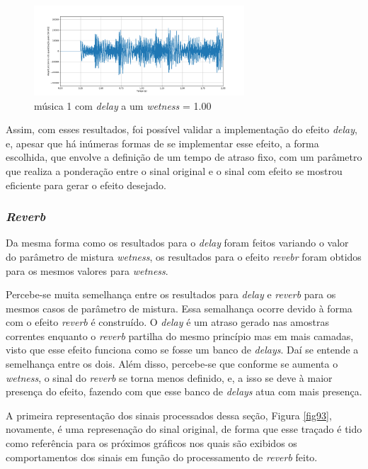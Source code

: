 \begin{figure}[h]
    \centering
    \includegraphics[width=0.7\textwidth]{figuras/fig92.png}
    \caption{música 1 com \textit{delay} a um \textit{wetness} = 1.00}
    \label{fig92}
\end{figure}

Assim, com esses resultados, foi possível validar a implementação do efeito \textit{delay}, e, apesar que há inúmeras formas de se implementar esse efeito, a forma escolhida, que envolve a definição de um tempo de atraso fixo, com um parâmetro que realiza a ponderação entre o sinal original e o sinal com efeito se mostrou eficiente para gerar o efeito desejado.

\subsubsection*{\textit{Reverb}}

Da mesma forma como os resultados para o \textit{delay} foram feitos variando o valor do parâmetro de mistura \textit{wetness}, os resultados para o efeito \textit{revebr} foram obtidos para os mesmos valores para \textit{wetness}.

Percebe-se muita semelhança entre os resultados para \textit{delay} e \textit{reverb} para os mesmos casos de parâmetro de mistura. Essa semalhança ocorre devido à forma com o efeito \textit{reverb} é construído. O \textit{delay} é um atraso gerado nas amostras correntes enquanto o \textit{reverb} partilha do mesmo princípio mas em mais camadas, visto que esse efeito funciona como se fosse um banco de \textit{delays}. Daí se entende a semelhança entre os dois. Além disso, percebe-se que conforme se aumenta o \textit{wetness}, o sinal do \textit{reverb} se torna menos definido, e, a isso se deve à maior presença do efeito, fazendo com que esse banco de \textit{delays} atua com mais presença.

A primeira representação dos sinais processados dessa seção, Figura \ref{fig93}, novamente, é uma represenação do sinal original, de forma que esse traçado é tido como referência para os próximos gráficos nos quais são exibidos os comportamentos dos sinais em função do processamento de \textit{reverb} feito.

